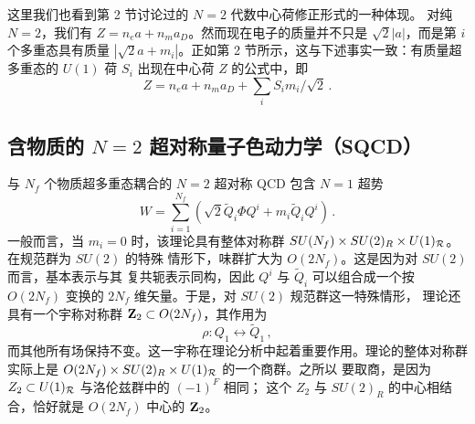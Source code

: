 
这里我们也看到第 2 节讨论过的 $N = 2$ 代数中心荷修正形式的一种体现。
对纯 $N=2$，我们有 $Z = n_e a + n_m a_D$。然而现在电子的质量并不只是
$\sqrt{2} |a|$，而是第 $i$ 个多重态具有质量
$|\sqrt{2} a + m_i |$。正如第 2 节所示，这与下述事实一致：有质量超多重态的
$U(1)$ 荷 $S_i$ 出现在中心荷 $Z$ 的公式中，即
$$
Z = n_e a + n_m a_D + \sum_i S_i m_i / \sqrt{2}\,.
$$


\subsection{含物质的 $N=2$ 超对称量子色动力学（SQCD）}

与 $N_f$ 个物质超多重态耦合的 $N=2$ 超对称 QCD 包含 $N=1$ 超势
$$
W=\sum_{i=1}^{N_f}(\sqrt{2}\widetilde{Q}_i\Phi
Q^i+m_i\tilde{Q}_iQ^i)\,. 
$$
一般而言，当 $m_i=0$ 时，该理论具有整体对称群
$SU(N_f)\times SU(2)_R\times U(1)_{\cal R}$。在规范群为 $SU(2)$ 的特殊
情形下，味群扩大为 $O(2N_f)$。这是因为对 $SU(2)$ 而言，基本表示与其
复共轭表示同构，因此 $Q^i$ 与 $\widetilde Q_i$ 可以组合成一个按
$O(2N_f)$ 变换的 $2N_f$ 维矢量。于是，对 $SU(2)$ 规范群这一特殊情形，
理论还具有一个宇称对称群 ${\bf Z}_2\subset O(2N_f)$，其作用为
\begin{equation}
\rho : Q_1 \leftrightarrow \widetilde{Q}_1\,,
\label{rho}
\end{equation}
而其他所有场保持不变。这一宇称在理论分析中起着重要作用。理论的整体对称群
实际上是 $O(2N_f) \times SU(2)_R \times U(1)_{\cal R}$ 的一个商群。之所以
要取商，是因为 $Z_2 \subset U(1)_{\cal R}$ 与洛伦兹群中的 $(-1)^F$ 相同；
这个 $Z_2$ 与 $SU(2)_R$ 的中心相结合，恰好就是 $O(2N_f)$ 中心的
${\bf Z}_2$。


